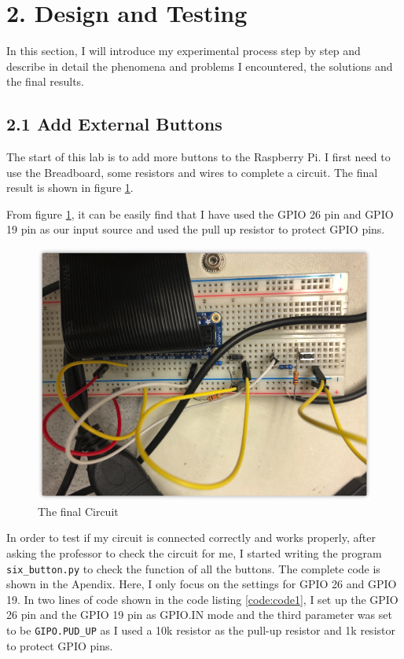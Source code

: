 \documentclass[12pt]{report}
\newcommand{\code}[1]{\colorbox{light-gray}{\texttt{#1}}}
\begin{document}
\section*{2. Design and Testing\vspace{-1em}}
In this section, I will introduce my experimental process step by step and describe in detail the phenomena and problems I encountered, the solutions and the final results.\vspace{-1em}
\subsection*{2.1 Add External Buttons}
The start of this lab is to add more buttons to the Raspberry Pi. I first need to use the Breadboard, some resistors and wires to complete a circuit. The final result is shown in figure \ref{fig:fig1}.\par
From figure \ref{fig:fig1}, it can be easily find that I have used the GPIO 26 pin and GPIO 19 pin as our input source and used the pull up resistor to protect GPIO pins. 
\begin{figure}[H]
    \centering
    \includegraphics[width=\textwidth]{img/Circuit.png}
    \caption{The final Circuit}
    \label{fig:fig1}
\end{figure}
In order to test if my circuit is connected correctly and works properly, after asking the professor to check the circuit for me, I started writing the program \code{six\_button.py} to check the function of all the buttons. The complete code is shown in the Apendix. Here, I only focus on the settings for GPIO 26 and GPIO 19. In two lines of code shown in the code listing \ref{code:code1}, I set up the GPIO 26 pin and the GPIO 19 pin as GPIO.IN mode and the third parameter was set to be \code{GIPO.PUD\_UP} as I used a 10k resistor as the pull-up resistor and 1k resistor to protect GPIO pins.
\end{document}
